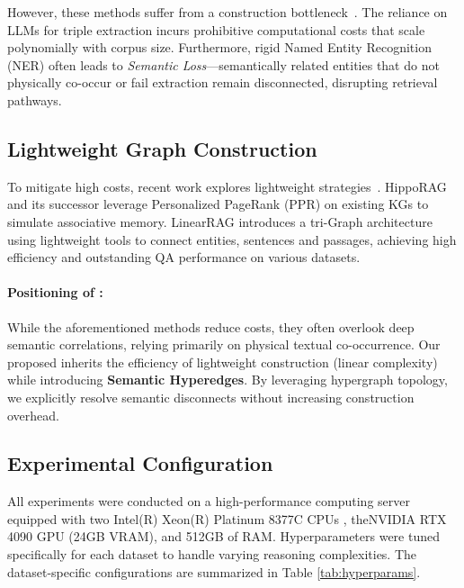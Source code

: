 However, these methods suffer from a construction bottleneck~\citep{edge2024local,sarthi2024raptor,jimenez2024hipporag}. The reliance on LLMs for triple extraction incurs prohibitive computational costs that scale polynomially with corpus size. Furthermore, rigid Named Entity Recognition (NER) often leads to \textit{Semantic Loss}—semantically related entities that do not physically co-occur or fail extraction remain disconnected, disrupting retrieval pathways.

\subsection{Lightweight Graph Construction}
To mitigate high costs, recent work explores lightweight strategies~\cite{huang2025ket,pan2024unifying,zhang2025adagcrag}. HippoRAG \cite{jimenez2024hipporag} and its successor \citep{gutiérrez2025hipporag2} leverage Personalized PageRank (PPR) on existing KGs to simulate associative memory. LinearRAG \cite{zhuang2025linearrag} introduces a tri-Graph architecture using lightweight tools to connect entities, sentences and passages, achieving high efficiency and outstanding QA performance on various datasets.

\paragraph{Positioning of \EHGRAG:} While the aforementioned methods reduce costs, they often overlook deep semantic correlations, relying primarily on physical textual co-occurrence. Our proposed \textbf{\EHGRAG} inherits the efficiency of lightweight construction (linear complexity) while introducing \textbf{Semantic Hyperedges}. By leveraging hypergraph topology, we explicitly resolve semantic disconnects without increasing construction overhead.


\subsection{Experimental Configuration}
\label{app:config}

All experiments were conducted on a high-performance computing server equipped with two Intel(R) Xeon(R) Platinum 8377C CPUs , theNVIDIA RTX 4090 GPU (24GB VRAM), and 512GB of RAM. Hyperparameters were tuned specifically for each dataset to handle varying reasoning complexities. The dataset-specific configurations are summarized in Table \ref{tab:hyperparams}.

